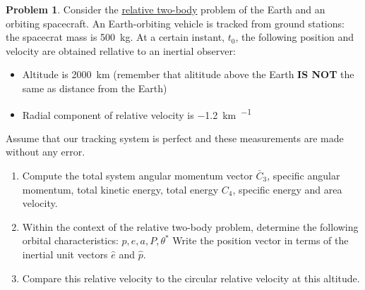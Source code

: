 \documentclass[10pt]{article}
\theoremstyle{definition}
\newtheorem{prob}{Problem}[section]
\newenvironment{subprob}%
{\renewcommand{\theenumi}{\alph{enumi}}\renewcommand{\labelenumi}{(\theenumi)}\begin{enumerate}}%
{\end{enumerate}}%
\begin{document}
\begin{prob}
    Consider the \underline{relative two-body} problem of the Earth and an orbiting spacecraft.
    An Earth-orbiting vehicle is tracked from ground stations: the spacecrat mass is \SI{500}{\kilo\gram}.
    At a certain instant, \( t_0 \), the following position and velocity are obtained rellative to an inertial observer:
    \begin{itemize}
        \item Altitude is \SI{2000}{\kilo\meter} (remember that alititude above the Earth  \textbf{IS NOT} the same as distance from the Earth)
        \item Radial component of relative velocity is \SI{-1.2}{\kilo\meter\per\sec}
    \end{itemize}

    Assume that our tracking system is perfect and these measurements are made without any error.
    \begin{subprob}
        \item Compute the total system angular momentum vector \( \bar C_3 \), specific angular momentum, total kinetic energy, total energy \( C_4 \), specific energy and area velocity.
        \item Within the context of the relative two-body problem, determine the following orbital characteristics: \( p, e, a, P, \theta^* \)
            Write the position vector in terms of the inertial unit vectors \( \hat e\) and \( \hat p \).
        \item Compare this relative velocity to the circular relative velocity at this altitude.
    \end{subprob}
\end{prob}
\end{document}
